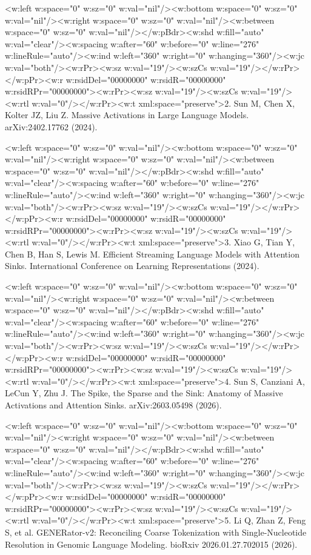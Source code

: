 \documentclass[11pt]{article}
\begin{document}
<w:left w:space="0" w:sz="0" w:val="nil"/><w:bottom w:space="0" w:sz="0" w:val="nil"/><w:right w:space="0" w:sz="0" w:val="nil"/><w:between w:space="0" w:sz="0" w:val="nil"/></w:pBdr><w:shd w:fill="auto" w:val="clear"/><w:spacing w:after="60" w:before="0" w:line="276" w:lineRule="auto"/><w:ind w:left="360" w:right="0" w:hanging="360"/><w:jc w:val="both"/><w:rPr><w:sz w:val="19"/><w:szCs w:val="19"/></w:rPr></w:pPr><w:r w:rsidDel="00000000" w:rsidR="00000000" w:rsidRPr="00000000"><w:rPr><w:sz w:val="19"/><w:szCs w:val="19"/><w:rtl w:val="0"/></w:rPr><w:t xml:space="preserve">2. Sun M, Chen X, Kolter JZ, Liu Z. Massive Activations in Large Language Models. arXiv:2402.17762 (2024).

<w:left w:space="0" w:sz="0" w:val="nil"/><w:bottom w:space="0" w:sz="0" w:val="nil"/><w:right w:space="0" w:sz="0" w:val="nil"/><w:between w:space="0" w:sz="0" w:val="nil"/></w:pBdr><w:shd w:fill="auto" w:val="clear"/><w:spacing w:after="60" w:before="0" w:line="276" w:lineRule="auto"/><w:ind w:left="360" w:right="0" w:hanging="360"/><w:jc w:val="both"/><w:rPr><w:sz w:val="19"/><w:szCs w:val="19"/></w:rPr></w:pPr><w:r w:rsidDel="00000000" w:rsidR="00000000" w:rsidRPr="00000000"><w:rPr><w:sz w:val="19"/><w:szCs w:val="19"/><w:rtl w:val="0"/></w:rPr><w:t xml:space="preserve">3. Xiao G, Tian Y, Chen B, Han S, Lewis M. Efficient Streaming Language Models with Attention Sinks. International Conference on Learning Representations (2024).

<w:left w:space="0" w:sz="0" w:val="nil"/><w:bottom w:space="0" w:sz="0" w:val="nil"/><w:right w:space="0" w:sz="0" w:val="nil"/><w:between w:space="0" w:sz="0" w:val="nil"/></w:pBdr><w:shd w:fill="auto" w:val="clear"/><w:spacing w:after="60" w:before="0" w:line="276" w:lineRule="auto"/><w:ind w:left="360" w:right="0" w:hanging="360"/><w:jc w:val="both"/><w:rPr><w:sz w:val="19"/><w:szCs w:val="19"/></w:rPr></w:pPr><w:r w:rsidDel="00000000" w:rsidR="00000000" w:rsidRPr="00000000"><w:rPr><w:sz w:val="19"/><w:szCs w:val="19"/><w:rtl w:val="0"/></w:rPr><w:t xml:space="preserve">4. Sun S, Canziani A, LeCun Y, Zhu J. The Spike, the Sparse and the Sink: Anatomy of Massive Activations and Attention Sinks. arXiv:2603.05498 (2026).

<w:left w:space="0" w:sz="0" w:val="nil"/><w:bottom w:space="0" w:sz="0" w:val="nil"/><w:right w:space="0" w:sz="0" w:val="nil"/><w:between w:space="0" w:sz="0" w:val="nil"/></w:pBdr><w:shd w:fill="auto" w:val="clear"/><w:spacing w:after="60" w:before="0" w:line="276" w:lineRule="auto"/><w:ind w:left="360" w:right="0" w:hanging="360"/><w:jc w:val="both"/><w:rPr><w:sz w:val="19"/><w:szCs w:val="19"/></w:rPr></w:pPr><w:r w:rsidDel="00000000" w:rsidR="00000000" w:rsidRPr="00000000"><w:rPr><w:sz w:val="19"/><w:szCs w:val="19"/><w:rtl w:val="0"/></w:rPr><w:t xml:space="preserve">5. Li Q, Zhan Z, Feng S, et al. GENERator-v2: Reconciling Coarse Tokenization with Single-Nucleotide Resolution in Genomic Language Modeling. bioRxiv 2026.01.27.702015 (2026).
\end{document}
